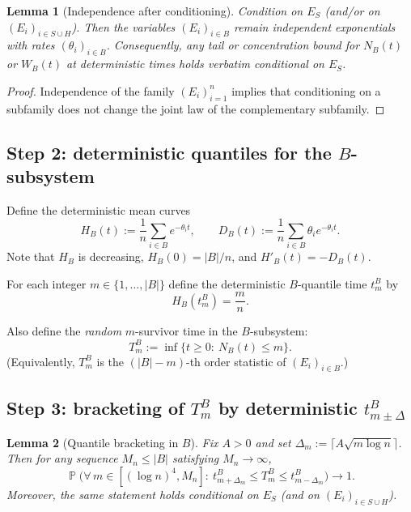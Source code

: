 \documentclass[11pt]{article}
\newtheorem{lem}{Lemma}
\DeclareMathOperator{\Pp}{\mathbb P}
\begin{document}
\begin{lem}[Independence after conditioning]\label{lem:cond-indep}
Condition on $E_S$ (and/or on $(E_i)_{i\in S\cup H}$).
Then the variables $(E_i)_{i\in B}$ remain independent exponentials with rates $(\theta_i)_{i\in B}$.
Consequently, any tail or concentration bound for $N_B(t)$ or $W_B(t)$ at deterministic times
holds \emph{verbatim} conditional on $E_S$.
\end{lem}

\begin{proof}
Independence of the family $(E_i)_{i=1}^n$ implies that conditioning on a subfamily does not
change the joint law of the complementary subfamily.
\end{proof}

\subsection*{Step 2: deterministic quantiles for the $B$-subsystem}

Define the deterministic mean curves
\begin{equation}\label{eq:HBDB}
H_B(t):=\frac{1}{n}\sum_{i\in B} e^{-\theta_i t},
\qquad
D_B(t):=\frac{1}{n}\sum_{i\in B} \theta_i e^{-\theta_i t}.
\end{equation}
Note that $H_B$ is decreasing, $H_B(0)=|B|/n$, and $H'_B(t)=-D_B(t)$.

For each integer $m\in\{1,\dots,|B|\}$ define the deterministic $B$-quantile time $t^B_m$ by
\begin{equation}\label{eq:tBm}
H_B(t^B_m)=\frac{m}{n}.
\end{equation}

Also define the \emph{random} $m$-survivor time in the $B$-subsystem:
\[
T^B_m:=\inf\{t\ge 0:\ N_B(t)\le m\}.
\]
(Equivalently, $T^B_m$ is the $(|B|-m)$-th order statistic of $(E_i)_{i\in B}$.)

\subsection*{Step 3: bracketing of $T^B_m$ by deterministic $t^B_{m\pm\Delta}$}

\begin{lem}[Quantile bracketing in $B$]\label{lem:bracket-B}
Fix $A>0$ and set $\Delta_m:=\lceil A\sqrt{m\log n}\rceil$.
Then for any sequence $M_n\le |B|$ satisfying $M_n\to\infty$,
\begin{equation}\label{eq:bracket-B}
\Pp\Big(\forall\, m\in[(\log n)^4,M_n]:\ t^B_{m+\Delta_m}\le T^B_m\le t^B_{m-\Delta_m}\Big)\to 1.
\end{equation}
Moreover, the same statement holds \emph{conditional on $E_S$} (and on $(E_i)_{i\in S\cup H}$).
\end{lem}
\end{document}
